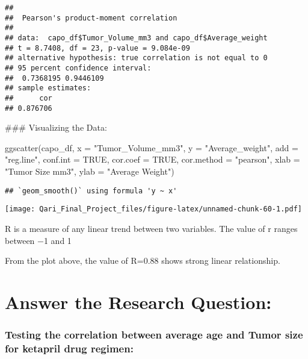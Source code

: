 \documentclass[
]{article}
\newenvironment{Shaded}{\begin{snugshade}}{\end{snugshade}}
\newcommand{\AttributeTok}[1]{\textcolor[rgb]{0.77,0.63,0.00}{#1}}
\newcommand{\ConstantTok}[1]{\textcolor[rgb]{0.00,0.00,0.00}{#1}}
\newcommand{\FunctionTok}[1]{\textcolor[rgb]{0.00,0.00,0.00}{#1}}
\newcommand{\NormalTok}[1]{#1}
\newcommand{\StringTok}[1]{\textcolor[rgb]{0.31,0.60,0.02}{#1}}
\begin{document}
\begin{verbatim}
## 
##  Pearson's product-moment correlation
## 
## data:  capo_df$Tumor_Volume_mm3 and capo_df$Average_weight
## t = 8.7408, df = 23, p-value = 9.084e-09
## alternative hypothesis: true correlation is not equal to 0
## 95 percent confidence interval:
##  0.7368195 0.9446109
## sample estimates:
##      cor 
## 0.876706
\end{verbatim}

\#\#\# Visualizing the Data:

\begin{Shaded}
\begin{Highlighting}[]
\FunctionTok{ggscatter}\NormalTok{(capo\_df, }\AttributeTok{x =} \StringTok{"Tumor\_Volume\_mm3"}\NormalTok{, }\AttributeTok{y =} \StringTok{"Average\_weight"}\NormalTok{, }
          \AttributeTok{add =} \StringTok{"reg.line"}\NormalTok{, }\AttributeTok{conf.int =} \ConstantTok{TRUE}\NormalTok{, }
          \AttributeTok{cor.coef =} \ConstantTok{TRUE}\NormalTok{, }\AttributeTok{cor.method =} \StringTok{"pearson"}\NormalTok{,}
          \AttributeTok{xlab =} \StringTok{"Tumor Size mm3"}\NormalTok{, }\AttributeTok{ylab =} \StringTok{"Average Weight"}\NormalTok{)}
\end{Highlighting}
\end{Shaded}

\begin{verbatim}
## `geom_smooth()` using formula 'y ~ x'
\end{verbatim}

\texttt{[image: Qari\_Final\_Project\_files/figure-latex/unnamed-chunk-60-1.pdf]}

R is a measure of any linear trend between two variables. The value of r
ranges between −1 and 1

From the plot above, the value of R=0.88 shows strong linear
relationship.

\hypertarget{answer-the-research-question}{%
\section{Answer the Research
Question:}\label{answer-the-research-question}}

\hypertarget{testing-the-correlation-between-average-age-and-tumor-size-for-ketapril-drug-regimen}{%
\subsubsection{Testing the correlation between average age and Tumor
size for ketapril drug
regimen:}\label{testing-the-correlation-between-average-age-and-tumor-size-for-ketapril-drug-regimen}}
\end{document}

